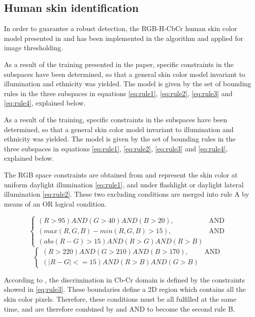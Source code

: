 \subsection{Human skin identification}
In order to guarantee a robust detection, the RGB-H-CbCr human skin color model presented
in \cite{Ref:SkinColorModel} and \cite{Ref:SkinDetection} has been implemented in the algorithm and applied for image thresholding. 

As a result of the training presented in the paper, specific constraints in the subspaces have been determined, so that a general skin color model invariant to illumination and ethnicity was yielded. 
The model is given by the set of bounding rules in the three subspaces in equations \ref{eq:rule1}, \ref{eq:rule2}, \ref{eq:rule3} and \ref{eq:rule4}, explained below.

As a result of the training, specific constraints in the subspaces have been determined,
so that a general skin color model invariant to illumination and ethnicity was yielded. 
The model is given by the set of bounding rules in the three subspaces in 
equations \ref{eq:rule1}, \ref{eq:rule2}, \ref{eq:rule3} and \ref{eq:rule4}, explained below.

The RGB space constraints are obtained from \cite{Ref:SkinColorModel} and represent the skin
color at uniform daylight illumination \ref{eq:rule1}, and under flashlight or daylight lateral
illumination \ref{eq:rule2}. These two excluding conditions are merged into rule A by means of an OR logical condition.

\begin{equation}
		\begin{cases}
		    (R > 95) AND (G > 40) AND (B > 20),& \text{AND}\\
		    (max(R, G, B) - min(R, G, B) > 15), & \text{AND}\\
		    (abs(R - G) > 15) AND (R > G) AND (R > B)
		\end{cases}
		\label{eq:rule1}
\end{equation}
\begin{equation}
		\begin{cases}
		    (R > 220) AND (G > 210) AND (B > 170),& \text{AND}\\
			(|R - G| <= 15) AND (R > B) AND (G > B)
		\end{cases}
	\label{eq:rule2}
\end{equation}

According to \cite{Ref:SkinDetection}, the discrimination in Cb-Cr domain is defined by the constraints showed in \ref{eq:rule3}.  
These boundaries define a 2D region which contains all the skin color pixels. 
Therefore, these conditions must be all fulfilled at the same time, and are therefore combined by and AND to become the second rule B.


